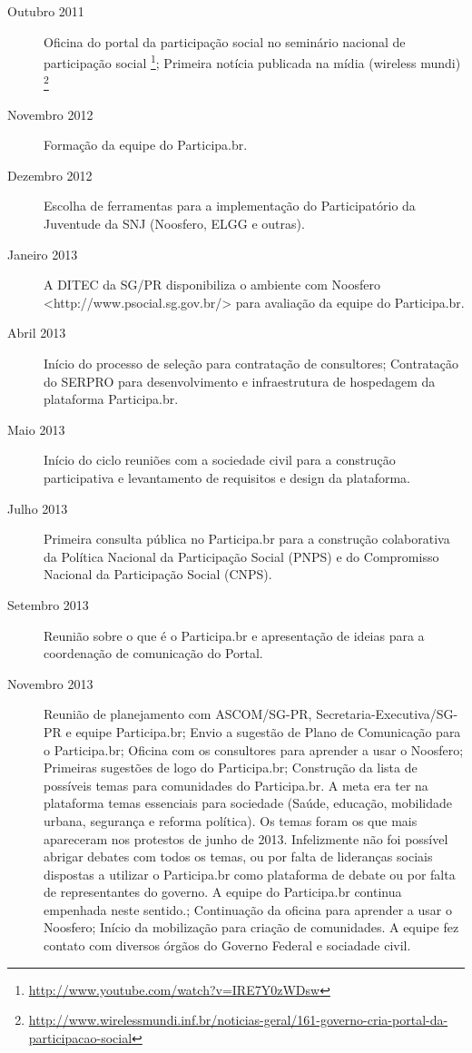 \documentclass{article}
\begin{document}
\begin{description}

  \item [Outubro 2011] Oficina do portal da participação social no seminário
  nacional de participação social \footnote{\url{http://www.youtube.com/watch?v=IRE7Y0zWDsw}};
  Primeira notícia publicada na mídia (wireless mundi)
  \footnote{\url{http://www.wirelessmundi.inf.br/noticias-geral/161-governo-cria-portal-da-participacao-social}}

  \item [Novembro 2012]
  Formação da equipe do Participa.br.

  \item [Dezembro 2012]
  Escolha de ferramentas para a implementação do Participatório da Juventude da
  SNJ (Noosfero, ELGG e outras).

  \item [Janeiro 2013]
  A DITEC da SG/PR disponibiliza o ambiente com Noosfero
  <http://www.psocial.sg.gov.br/> para avaliação da equipe do Participa.br.

  \item [Abril 2013]
  Início do processo de seleção para contratação de consultores;
  Contratação do SERPRO para desenvolvimento e infraestrutura de hospedagem da plataforma Participa.br.

  \item [Maio 2013]
  Início do ciclo reuniões com a sociedade civil para a construção
  participativa e levantamento de requisitos e design da plataforma.

  \item [Julho 2013]
  Primeira consulta pública  no Participa.br para a construção colaborativa da
  Política Nacional da Participação Social (PNPS) e do Compromisso Nacional da
  Participação Social (CNPS).

  \item [Setembro 2013]
  Reunião sobre o que é o Participa.br e apresentação de ideias para a
  coordenação de comunicação do Portal.

  \item [Novembro 2013]
  Reunião de planejamento com ASCOM/SG-PR, Secretaria-Executiva/SG-PR e equipe Participa.br;
  Envio a sugestão de Plano de Comunicação para o Participa.br;
  Oficina com os consultores para aprender a usar o Noosfero;
  Primeiras sugestões de logo do Participa.br;
  Construção da lista de possíveis temas para comunidades do Participa.br. A meta era ter na plataforma temas essenciais para sociedade (Saúde, educação, mobilidade urbana, segurança e reforma política). Os temas foram os que mais apareceram nos protestos de junho de 2013. Infelizmente não foi possível abrigar debates com todos os temas, ou por falta de lideranças sociais dispostas a utilizar o Participa.br como plataforma de debate ou por falta de representantes do governo. A equipe do Participa.br continua empenhada neste sentido.;
  Continuação da oficina para aprender a usar o Noosfero;
  Início da mobilização para criação de comunidades. A equipe fez contato com diversos órgãos do Governo Federal e sociadade civil.


\end{description}
\end{document}
